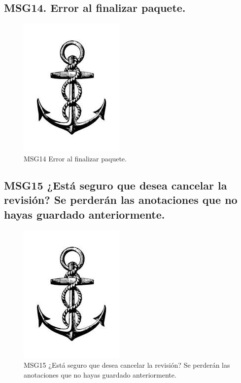 \subsection{MSG14. Error al finalizar paquete.}
    \begin{figure}[htbp]
        \begin{center}
            \includegraphics[width=.4\textwidth]{images/MSG/ancla}
            \caption{MSG14 Error al finalizar paquete.}
            \label{fig:MSG14}
        \end{center}
    \end{figure}

\subsection{MSG15 ¿Está seguro que desea cancelar la revisión? Se perderán las anotaciones que no hayas guardado anteriormente.}
    \begin{figure}[htbp]
        \begin{center}
            \includegraphics[width=.4\textwidth]{images/MSG/ancla}
            \caption{MSG15 ¿Está seguro que desea cancelar la revisión? Se perderán las anotaciones que no hayas guardado anteriormente.}
            \label{fig:MSG15}
        \end{center}
    \end{figure}

